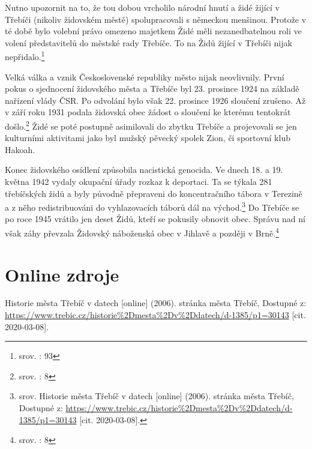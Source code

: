 \documentclass[a4paper,oneside,12p]{report}
\let\openright=\clearpage
\begin{document}
Nutno upozornit na to, že tou dobou vrcholilo národní hnutí a židé žijící v Třebíči (nikoliv židovském městě) spolupracovali s německou menšinou.
Protože v té době bylo volební právo omezeno majetkem Židé měli nezanedbatelnou roli ve volení představitelů do městské rady Třebíče.
To na  Židů žijící v Třebíči nijak nepřidalo.\footnote{srov. \cite{Janak1981}: 93}

Velká válka a vznik Československé republiky město nijak neovlivnily.
První pokus o sjednocení židovského města a Třebíče byl 23. prosince 1924 na základě nařízení vlády ČSR.
Po odvolání bylo však 22. prosince 1926 sloučení zrušeno.
Až v září roku 1931 podala židovská obec žádost o sloučení ke kterému tentokrát došlo.\footnote{srov. \cite{Klenovsky2003}: 8}
Židé se poté postupně asimilovali do zbytku Třebíče a projevovali se jen kulturními aktivitami jako byl mužský pěvecký spolek Zion, či sportovní klub Hakoah.

Konec židovského osídlení způsobila nacistická genocida.
Ve dnech 18. a 19. května 1942 vydaly okupační úřady rozkaz k deportaci.
Ta se týkala 281 třebíčských židů a byly původně přepraveni do koncentračního tábora v Terezině a z něho redistribuováni do vyhlazovacích táborů dál na východ.\footnote{srov. Historie města Třebíč v datech [online] (2006). stránka města Třebíč, Dostupné z: \url{https://www.trebic.cz/historie\%2Dmesta\%2Dv\%2Ddatech/d-1385/p1=30143} [cit. 2020-03-08]. }
Do Třebíče se po roce 1945 vrátilo jen deset Židů, kteří se pokusily obnovit obec.
Správu nad ní však záhy převzala Židovský náboženská obec v Jihlavě a později v Brně.\footnote{srov. \cite{Klenovsky2003}: 8}




\chapter*{Online zdroje}
\noindent
Historie města Třebíč v datech [online] (2006). stránka města Třebíč, Dostupné z: \url{https://www.trebic.cz/historie\%2Dmesta\%2Dv\%2Ddatech/d-1385/p1=30143} [cit. 2020-03-08].

\listoffigures
\openright
\end{document}
